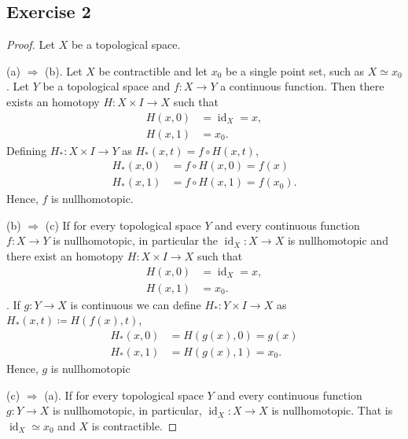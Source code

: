 \documentclass[11pt,a4paper]{article}
\newcommand{\id}{\operatorname{id}}
\begin{document}
\subsection*{Exercise 2}
\begin{proof}
  Let $ X $ be a topological space.

  \vspace{0.5cm}
  (a) $\Rightarrow$ (b). Let $ X $ be contractible and let $ x_0 $ be a single point set, such as $ X \simeq x_0$. Let $ Y $ be a topological space and $ f \colon X \to Y $ a continuous function. Then there exists an homotopy $ H \colon X \times I \to X$ such that
  \begin{align*}
    H(x, 0) &= \id_X = x, \\
    H(x, 1) &= x_0.
  \end{align*}
  Defining $ H_* \colon X \times I \to Y $ as $ H_*(x, t) = f \circ H(x, t) $,
  \begin{align*}
    H_*(x, 0) &= f \circ H(x, 0) = f(x)\\
    H_*(x, 1) &= f \circ H(x, 1) = f(x_0).
  \end{align*}
  Hence, $ f $ is nullhomotopic.

  \vspace{0.5cm}
  (b) $\Rightarrow$ (c) If for every topological space $ Y $ and every continuous function $ f \colon X \to Y $ is nullhomotopic, in particular the $ \id_X \colon X \to X $ is nullhomotopic and there exist an homotopy $ H \colon X \times I \to X$ such that
  \begin{align*}
    H(x, 0) &= \id_X = x, \\
    H(x, 1) &= x_0.
  \end{align*}.
  If $ g \colon Y \to X $ is continuous we can define $ H_* \colon Y \times I \to X $ as $ H_*(x, t) \coloneq H(f(x), t) $,
  \begin{align*}
    H_*(x, 0) &= H(g(x), 0) = g(x)\\
    H_*(x, 1) &= H(g(x), 1) = x_0.
  \end{align*}
  Hence, $ g $ is nullhomotopic

  \vspace{0.5cm}
  (c) $\Rightarrow$ (a). If for every topological space $ Y $ and every continuous function $ g \colon Y \to X $ is nullhomotopic, in particular, $ \id_X \colon X \to X $ is nullhomotopic. That is $ \id_X \simeq x_0 $ and $ X $ is contractible.
\end{proof}
\end{document}
